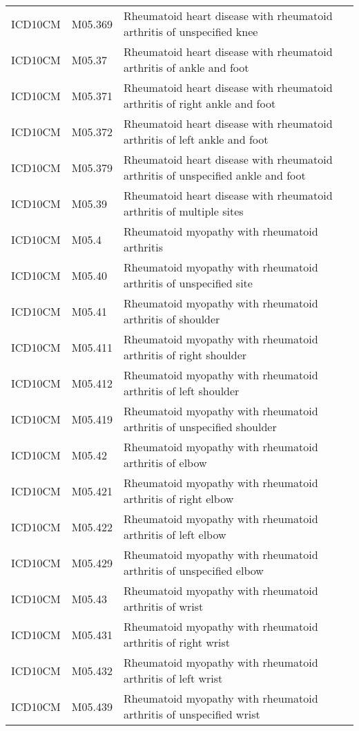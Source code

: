\begin{table}[ht]
\begin{tabular}{lll}
  ICD10CM & M05.369 & Rheumatoid heart disease with rheumatoid arthritis of unspecified knee \\ 
  ICD10CM & M05.37 & Rheumatoid heart disease with rheumatoid arthritis of ankle and foot \\ 
  ICD10CM & M05.371 & Rheumatoid heart disease with rheumatoid arthritis of right ankle and foot \\ 
  ICD10CM & M05.372 & Rheumatoid heart disease with rheumatoid arthritis of left ankle and foot \\ 
  ICD10CM & M05.379 & Rheumatoid heart disease with rheumatoid arthritis of unspecified ankle and foot \\ 
  ICD10CM & M05.39 & Rheumatoid heart disease with rheumatoid arthritis of multiple sites \\ 
  ICD10CM & M05.4 & Rheumatoid myopathy with rheumatoid arthritis \\ 
  ICD10CM & M05.40 & Rheumatoid myopathy with rheumatoid arthritis of unspecified site \\ 
  ICD10CM & M05.41 & Rheumatoid myopathy with rheumatoid arthritis of shoulder \\ 
  ICD10CM & M05.411 & Rheumatoid myopathy with rheumatoid arthritis of right shoulder \\ 
  ICD10CM & M05.412 & Rheumatoid myopathy with rheumatoid arthritis of left shoulder \\ 
  ICD10CM & M05.419 & Rheumatoid myopathy with rheumatoid arthritis of unspecified shoulder \\ 
  ICD10CM & M05.42 & Rheumatoid myopathy with rheumatoid arthritis of elbow \\ 
  ICD10CM & M05.421 & Rheumatoid myopathy with rheumatoid arthritis of right elbow \\ 
  ICD10CM & M05.422 & Rheumatoid myopathy with rheumatoid arthritis of left elbow \\ 
  ICD10CM & M05.429 & Rheumatoid myopathy with rheumatoid arthritis of unspecified elbow \\ 
  ICD10CM & M05.43 & Rheumatoid myopathy with rheumatoid arthritis of wrist \\ 
  ICD10CM & M05.431 & Rheumatoid myopathy with rheumatoid arthritis of right wrist \\ 
  ICD10CM & M05.432 & Rheumatoid myopathy with rheumatoid arthritis of left wrist \\ 
  ICD10CM & M05.439 & Rheumatoid myopathy with rheumatoid arthritis of unspecified wrist \\ 

\end{tabular}
\end{table}
